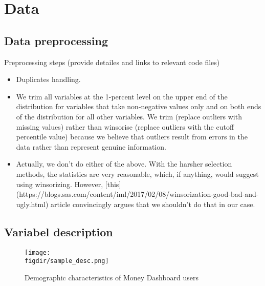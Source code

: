 
\section{Data}%
\label{sec:data}

\subsection{Data preprocessing}%
\label{sub:data_preprocessing}

Preprocessing steps
(provide detailes and links to relevant code files)
\begin{itemize}
    \item Duplicates handling.
    \item We trim all variables at the 1-percent level on the upper end of the
        distribution for variables that take non-negative values only and on
        both ends of the distribution for all other variables. We trim
        (replace outliers with missing values) rather than winsorise (replace
        outliers with the cutoff percentile value) because we believe that
        outliers result from errors in the data rather than represent genuine
        information.

    \item Actually, we don't do either of the above. With the harsher selection
        methods, the statistics are very reasonable, which, if anything, would
        suggest using winsorizing. However,
        [this](https://blogs.sas.com/content/iml/2017/02/08/winsorization-good-bad-and-ugly.html)
        article convincingly argues that we shouldn't do that in our case.

\end{itemize}


\subsection{Variabel description}%
\label{sub:variabel_description}

\begin{figure}[H]
    \caption{Demographic characteristics of Money Dashboard users}
    \label{fig:demographics}
    \begin{center}
        \texttt{[image: \\figdir/sample\_desc.png]}
    \end{center}
\end{figure}

